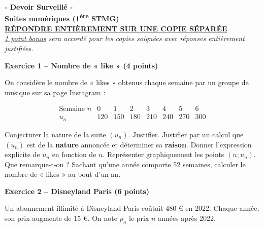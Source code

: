 \documentclass[12pt,a4paper]{exam}
\begin{document}
\begin{center}
\Large \textbf{- Devoir Surveillé -\\Suites numériques (1\textsuperscript{ère} STMG)}
\vspace{0.5cm}
\\\large \underline{\textbf{RÉPONDRE ENTIÈREMENT SUR UNE COPIE SÉPARÉE}}
\vspace{0.5cm}
\\ \textit{\underline{1 point bonus} sera accordé pour les copies soignées avec réponses 
entièrement justifiées.}
\end{center}
\vspace{0.4cm}
\noindent\hrulefill
\vspace{0.5cm}

\textbf{Exercice 1 – Nombre de « like » (4 points)}
\vspace{5pt}

On considère le nombre de « likes » obtenus chaque semaine par un groupe de musique
sur sa page Instagram :

\[
\begin{array}{c|c|c|c|c|c|c|c|}
\text{Semaine }n & 0 & 1 & 2 & 3 & 4 & 5 & 6\\
\hline
u_n & 120 & 150 & 180 & 210 & 240 & 270 & 300
\end{array}
\]
\vspace{2pt}
\begin{questions}
    \question[1] Conjecturer la nature de la suite \((u_n)\). Justifier.
    \question[1] Justifier par un calcul que \((u_n)\) est de la \textbf{nature} annoncée et déterminer sa 
    \textbf{raison}.
    \question[1] Donner l’expression explicite de \(u_n\) en fonction de $n$.
    \question[1] Représenter graphiquement les points \((n;u_n)\). Que remarque-t-on ?
    \question[1] Sachant qu'une année comporte 52 semaines, calculer le nombre de « likes »
     au bout d'un an.
\end{questions}

\noindent\hrulefill
\vspace{0.5cm}

\textbf{Exercice 2 – Disneyland Paris (6 points)}
\vspace{5pt}

Un abonnement illimité à Disneyland Paris coûtait 480 € en 2022.  
Chaque année, son prix augmente de 15 €.  
On note \(p_n\) le prix \(n\) années après 2022.
\end{document}
